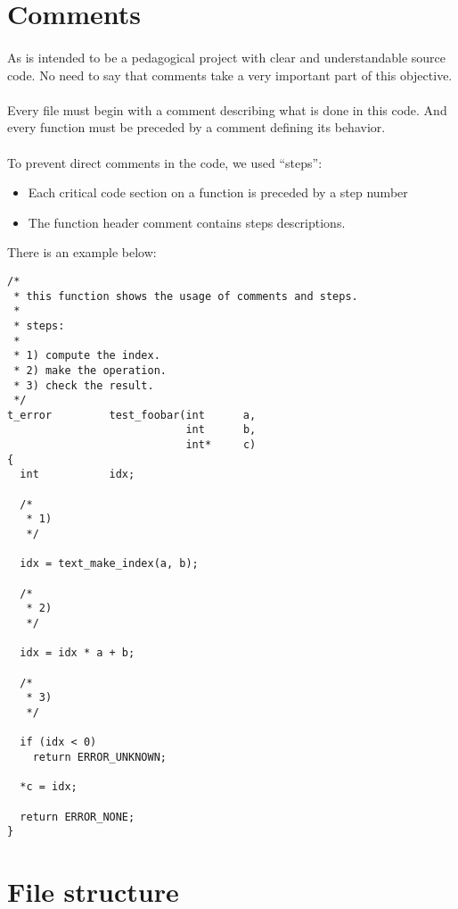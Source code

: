 \section*{Comments}

\paragraph{}
As \kaneton  is intended  to be a  pedagogical project with  clear and
understandable source code.  No need to say that  comments take a very
important part of this objective.

\paragraph{}
Every file must  begin with a comment describing what  is done in this
code. And  every function must be  preceded by a  comment defining its
behavior.

\paragraph{}
To prevent direct comments in the code, we used ``steps'':

\begin{itemize}

\item Each critical  code section on a function is  preceded by a step
number

\item The function header comment contains steps descriptions.

\end{itemize}

There is an example below:

\begin{verbatim}
/*
 * this function shows the usage of comments and steps.
 *
 * steps:
 *
 * 1) compute the index.
 * 2) make the operation.
 * 3) check the result.
 */
t_error         test_foobar(int      a,
                            int      b,
                            int*     c)
{
  int           idx;

  /*
   * 1)
   */

  idx = text_make_index(a, b);

  /*
   * 2)
   */

  idx = idx * a + b;

  /*
   * 3)
   */

  if (idx < 0)
    return ERROR_UNKNOWN;

  *c = idx;

  return ERROR_NONE;
}
\end{verbatim}

\section*{File structure}


